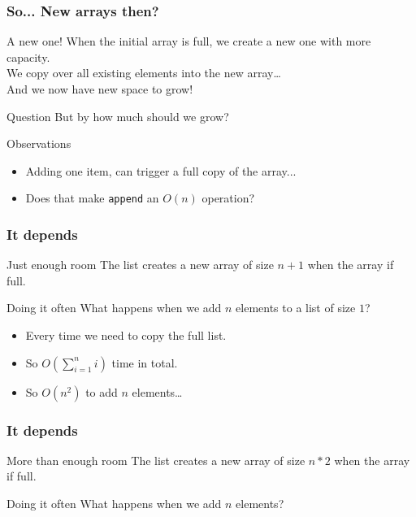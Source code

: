 \begin{frame}
	\frametitle{So... New arrays then?}
	\begin{block}{A new one!}
		When the initial array is full, we create a new one with more capacity.\\
		We copy over all existing elements into the new array\dots\\
		And we now have new space to grow!
	\end{block}	
	\pause
	\begin{block}{Question}
		But by how much should we grow?	
	\end{block}
	\pause
	\begin{block}{Observations}
		\begin{itemize}
			\item Adding one item, can trigger a full copy of the array...
			\item Does that make \texttt{append} an $O(n)$ operation?
		\end{itemize}
	\end{block}	
\end{frame}

\begin{frame}
	\frametitle{It depends}
	\begin{block}{Just enough room}
		The list creates a new array of size $n+1$ when the array if full.
	\end{block}	
	\begin{block}{Doing it often}
		What happens when we add $n$ elements to a list of size $1$?\\
		\begin{itemize}
			\item Every time we need to copy the full list.
			\item So $O(\sum\limits_{i=1}^{n}i)$ time in total.
			\item So $O(n^2)$ to add $n$ elements\dots
		\end{itemize}
	\end{block}	
\end{frame}

\begin{frame}
	\frametitle{It depends}
	\begin{block}{More than enough room}
		The list creates a new array of size $n*2$ when the array if full.
	\end{block}	
	\begin{block}{Doing it often}
		What happens when we add $n$ elements?
	\end{block}
\end{frame}

